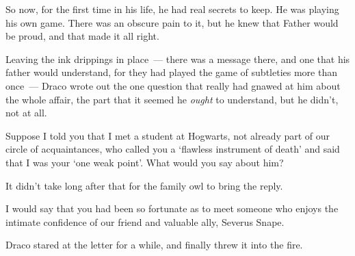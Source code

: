 So now, for the first time in his life, he had real secrets to keep. He was
playing his own game. There was an obscure pain to it, but he knew that Father
would be proud, and that made it all right.

Leaving the ink drippings in place~--- there was a message there, and one that
his father would understand, for they had played the game of subtleties more
than once~--- Draco wrote out the one question that really had gnawed at him
about the whole affair, the part that it seemed he \emph{ought} to understand,
but he didn't, not at all.

\begin{writtenNote}

Suppose I told you that I met a student at Hogwarts, not already part of
our circle of acquaintances, who called you a `flawless instrument of death'
and said that I was your `one weak point'. What would you say about him?
\end{writtenNote}

It didn't take long after that for the family owl to bring the reply.

\begin{writtenNote}

I would say that you had been so fortunate as to meet someone who enjoys
the intimate confidence of our friend and valuable ally, Severus Snape.
\end{writtenNote}

Draco stared at the letter for a while, and finally threw it into the fire.
